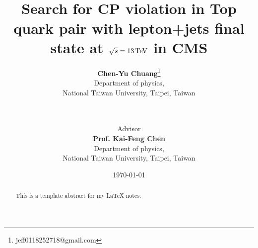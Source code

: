 \title{\aline{}\\Search for CP violation in Top quark pair with lepton+jets final state at $\sqrt{s} = 13\,\text{Te\hspace{-.08em}V}$ in CMS\\\aline{}}
\author{
\textbf{Chen-Yu Chuang}\thanks{jeff0118252718@gmail.com}\\
Department of physics,\\
National Taiwan University, Taipei, Taiwan\\
~\\
~\\
\and
Advisor\\
\textbf{Prof. Kai-Feng Chen}\\
Department of physics,\\
National Taiwan University, Taipei, Taiwan
}
\date{\today}
\maketitle
\thispagestyle{empty} %

\newpage
\thispagestyle{empty} %
\begin{abstract}
This is a template abstract for my \LaTeX{} notes.
\end{abstract}
\newpage

\FloatBarrier
